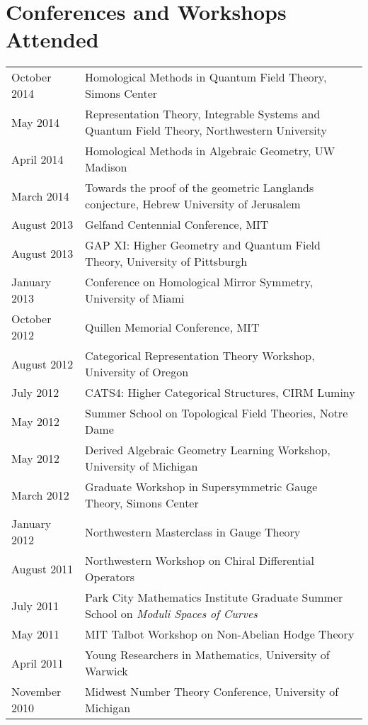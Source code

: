 \documentclass[10pt,oneside]{article}
\newcommand\T{\rule{0pt}{2.6ex}}
\begin{document}
\section*{Conferences and Workshops Attended} 
\begin{longtable}{ll}
October 2014 \T & Homological Methods in Quantum Field Theory, Simons Center \\
May 2014 \T & Representation Theory, Integrable Systems and Quantum Field Theory, Northwestern University \\
April 2014 \T & Homological Methods in Algebraic Geometry, UW Madison\\
March 2014 \T & Towards the proof of the geometric Langlands conjecture, Hebrew University of Jerusalem\\
August 2013 \T & Gelfand Centennial Conference, MIT \\
August 2013 \T & GAP XI: Higher Geometry and Quantum Field Theory, University of Pittsburgh \\
January 2013 \T & Conference on Homological Mirror Symmetry, University of Miami \\ 
October 2012 \T & Quillen Memorial Conference, MIT \\
August 2012 \T & Categorical Representation Theory Workshop, University of Oregon \\
July 2012 \T & CATS4: Higher Categorical Structures, CIRM Luminy \\
May 2012 \T & Summer School on Topological Field Theories, Notre Dame \\
May 2012 \T & Derived Algebraic Geometry Learning Workshop, University of Michigan \\
March 2012 \T & Graduate Workshop in Supersymmetric Gauge Theory, Simons Center \\
January 2012 \T & Northwestern Masterclass in Gauge Theory\\
August 2011 \T & Northwestern Workshop on Chiral Differential Operators \\
July 2011 \T & Park City Mathematics Institute Graduate Summer School on \emph{Moduli Spaces of Curves} \\
May 2011 \T & MIT Talbot Workshop on Non-Abelian Hodge Theory \\
April 2011 \T & Young Researchers in Mathematics, University of Warwick\\
November 2010 \T & Midwest Number Theory Conference, University of Michigan
\end{longtable}
\end{document}
